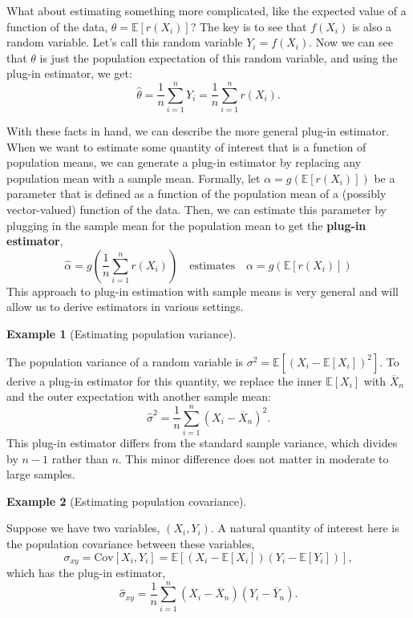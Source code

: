 \documentclass[
  letterpaper,
  DIV=11,
  numbers=noendperiod]{scrreprt}
\newcommand{\E}{\mathbb{E}}
\newcommand{\Xbar}{\overline{X}}
\newcommand{\Ybar}{\overline{Y}}
\theoremstyle{definition}
\newtheorem{example}{Example}[chapter]
\theoremstyle{definition}
\theoremstyle{plain}
\theoremstyle{remark}
\begin{document}
What about estimating something more complicated, like the expected
value of a function of the data, \(\theta = \E[r(X_i)]\)? The key is to
see that \(f(X_i)\) is also a random variable. Let's call this random
variable \(Y_i = f(X_i)\). Now we can see that \(\theta\) is just the
population expectation of this random variable, and using the plug-in
estimator, we get: \[
\widehat{\theta} = \frac{1}{n} \sum_{i=1}^n Y_i = \frac{1}{n} \sum_{i=1}^n r(X_i). 
\]

With these facts in hand, we can describe the more general plug-in
estimator. When we want to estimate some quantity of interest that is a
function of population means, we can generate a plug-in estimator by
replacing any population mean with a sample mean. Formally, let
\(\alpha = g\left(\E[r(X_i)]\right)\) be a parameter that is defined as
a function of the population mean of a (possibly vector-valued) function
of the data. Then, we can estimate this parameter by plugging in the
sample mean for the population mean to get the \textbf{plug-in
estimator}, \[
\widehat{\alpha} = g\left( \frac{1}{n} \sum_{i=1}^n r(X_i) \right) \quad \text{estimates} \quad \alpha = g\left(\E[r(X_i)]\right)
\] This approach to plug-in estimation with sample means is very general
and will allow us to derive estimators in various settings.

\begin{example}[Estimating population
variance]\protect\hypertarget{exm-var-est}{}\label{exm-var-est}

The population variance of a random variable is
\(\sigma^2 = \E[(X_i - \E[X_i])^2]\). To derive a plug-in estimator for
this quantity, we replace the inner \(\E[X_i]\) with \(\Xbar_n\) and the
outer expectation with another sample mean: \[
\widehat{\sigma}^2 = \frac{1}{n} \sum_{i=1}^n (X_i - \Xbar_n)^2.
\] This plug-in estimator differs from the standard sample variance,
which divides by \(n - 1\) rather than \(n\). This minor difference does
not matter in moderate to large samples.

\end{example}

\begin{example}[Estimating population
covariance]\protect\hypertarget{exm-cov-est}{}\label{exm-cov-est}

Suppose we have two variables, \((X_i, Y_i)\). A natural quantity of
interest here is the population covariance between these variables, \[
\sigma_{xy} = \text{Cov}[X_i,Y_i] = \E[(X_i - \E[X_i])(Y_i-\E[Y_i])],
\] which has the plug-in estimator, \[
\widehat{\sigma}_{xy} = \frac{1}{n} \sum_{i=1}^n (X_i - \Xbar_n)(Y_i - \Ybar_n).
\]

\end{example}
\end{document}
